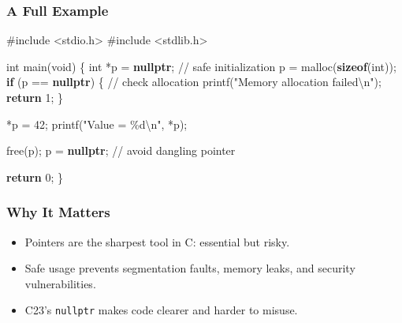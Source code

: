 \documentclass[
  letterpaper,
  DIV=11,
  numbers=noendperiod]{scrreprt}
\newenvironment{Shaded}{\begin{snugshade}}{\end{snugshade}}
\newcommand{\CommentTok}[1]{\textcolor[rgb]{0.37,0.37,0.37}{#1}}
\newcommand{\ControlFlowTok}[1]{\textcolor[rgb]{0.00,0.23,0.31}{\textbf{#1}}}
\newcommand{\DataTypeTok}[1]{\textcolor[rgb]{0.68,0.00,0.00}{#1}}
\newcommand{\DecValTok}[1]{\textcolor[rgb]{0.68,0.00,0.00}{#1}}
\newcommand{\ImportTok}[1]{\textcolor[rgb]{0.00,0.46,0.62}{#1}}
\newcommand{\KeywordTok}[1]{\textcolor[rgb]{0.00,0.23,0.31}{\textbf{#1}}}
\newcommand{\NormalTok}[1]{\textcolor[rgb]{0.00,0.23,0.31}{#1}}
\newcommand{\OperatorTok}[1]{\textcolor[rgb]{0.37,0.37,0.37}{#1}}
\newcommand{\PreprocessorTok}[1]{\textcolor[rgb]{0.68,0.00,0.00}{#1}}
\newcommand{\SpecialCharTok}[1]{\textcolor[rgb]{0.37,0.37,0.37}{#1}}
\newcommand{\StringTok}[1]{\textcolor[rgb]{0.13,0.47,0.30}{#1}}
\providecommand{\tightlist}{%
  \setlength{\itemsep}{0pt}\setlength{\parskip}{0pt}}
\begin{document}
\subsubsection{A Full Example}\label{a-full-example-13}

\begin{Shaded}
\begin{Highlighting}[]
\PreprocessorTok{\#include }\ImportTok{\textless{}stdio.h\textgreater{}}
\PreprocessorTok{\#include }\ImportTok{\textless{}stdlib.h\textgreater{}}

\DataTypeTok{int}\NormalTok{ main}\OperatorTok{(}\DataTypeTok{void}\OperatorTok{)} \OperatorTok{\{}
    \DataTypeTok{int} \OperatorTok{*}\NormalTok{p }\OperatorTok{=} \KeywordTok{nullptr}\OperatorTok{;}       \CommentTok{// safe initialization}
\NormalTok{    p }\OperatorTok{=}\NormalTok{ malloc}\OperatorTok{(}\KeywordTok{sizeof}\OperatorTok{(}\DataTypeTok{int}\OperatorTok{));}
    \ControlFlowTok{if} \OperatorTok{(}\NormalTok{p }\OperatorTok{==} \KeywordTok{nullptr}\OperatorTok{)} \OperatorTok{\{}     \CommentTok{// check allocation}
\NormalTok{        printf}\OperatorTok{(}\StringTok{"Memory allocation failed}\SpecialCharTok{\textbackslash{}n}\StringTok{"}\OperatorTok{);}
        \ControlFlowTok{return} \DecValTok{1}\OperatorTok{;}
    \OperatorTok{\}}

    \OperatorTok{*}\NormalTok{p }\OperatorTok{=} \DecValTok{42}\OperatorTok{;}
\NormalTok{    printf}\OperatorTok{(}\StringTok{"Value = }\SpecialCharTok{\%d\textbackslash{}n}\StringTok{"}\OperatorTok{,} \OperatorTok{*}\NormalTok{p}\OperatorTok{);}

\NormalTok{    free}\OperatorTok{(}\NormalTok{p}\OperatorTok{);}
\NormalTok{    p }\OperatorTok{=} \KeywordTok{nullptr}\OperatorTok{;}            \CommentTok{// avoid dangling pointer}

    \ControlFlowTok{return} \DecValTok{0}\OperatorTok{;}
\OperatorTok{\}}
\end{Highlighting}
\end{Shaded}

\subsubsection{Why It Matters}\label{why-it-matters-33}

\begin{itemize}
\tightlist
\item
  Pointers are the sharpest tool in C: essential but risky.
\item
  Safe usage prevents segmentation faults, memory leaks, and security
  vulnerabilities.
\item
  C23's \texttt{nullptr} makes code clearer and harder to misuse.
\end{itemize}
\end{document}
